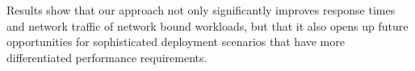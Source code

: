 Results show that our approach not only significantly improves response times and network traffic of network bound workloads, but that it also opens up future opportunities for sophisticated deployment scenarios that have more differentiated performance requirements.


   